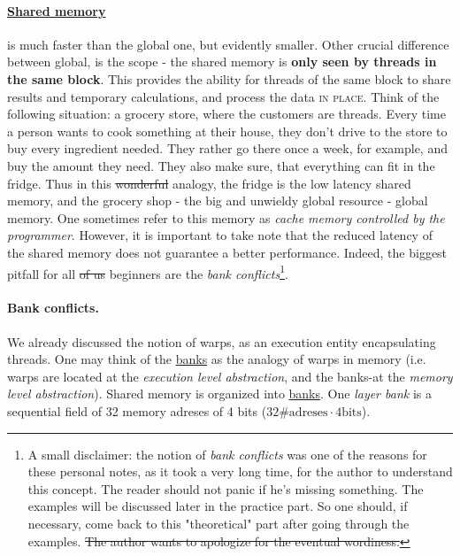 \vspace{-15pt}
\paragraph{\underline{Shared memory}} \label{grocery_store} is much faster than the global one, but evidently smaller. Other 
crucial difference between global, is the scope - the shared memory is \textbf{only seen by threads in the same block}. This provides 
the ability for threads of the same block to share results and temporary calculations, and process the data \textsc{in place}. 
Think of the following situation: a grocery store, where the customers are threads. Every time a person 
wants to cook something at their house, they don't drive to the store to buy every ingredient needed. They rather go there 
once a week, for example, and buy the amount they need. They also make sure, 
that everything can fit in the fridge. Thus 
in this \sout{wonderful} analogy, the fridge is the low latency shared memory, and the grocery shop - the 
big and unwieldy global resource - global memory.
One sometimes refer to this memory as 
\textsl{cache memory controlled by the programmer}. However, it is important to take note that the reduced 
latency of the shared memory does not guarantee a better performance. Indeed, the biggest pitfall for all \sout{of us} beginners 
are the \textit{bank conflicts}\footnote{A small disclaimer: the notion of \textit{bank conflicts} was one of the reasons for these personal 
notes, as it took a very long time, for the author to understand this concept. The reader should not panic if he's missing something. The examples will be discussed later in the practice part. So one 
should, if necessary, come back to this "theoretical" part after going through the examples. \sout{The author wants to apologize 
for the eventual wordiness.}}. 

\paragraph{Bank conflicts.}We already discussed the notion of warps, as an execution entity encapsulating threads. 
One may think of the \underline{banks} as the analogy of warps in memory
 (i.e. warps are located at the \textit{execution level abstraction}, and the 
 banks-at the \textit{memory level abstraction}). 
 Shared memory is organized into \underline{banks}.
One \textit{layer bank} is a sequential field of 32 memory adreses of 4 bits ($32\text{\#adreses}\cdot 4\text{bits}$). 

